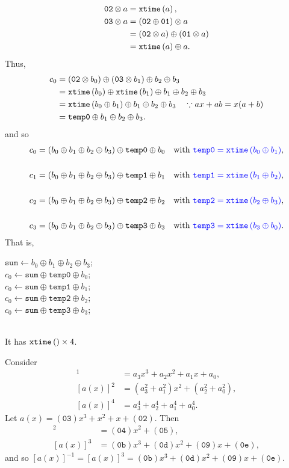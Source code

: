 \begin{align*}
	\texttt{02}\otimes a&=\texttt{xtime}\left(a\right), \\
	\texttt{03}\otimes a&=(\texttt{02}\oplus \texttt{01})\otimes a\\
	&=(\texttt{02}\otimes a)\oplus(\texttt{01}\otimes a) \\
	&=\texttt{xtime}\left(a\right)\oplus a.
\end{align*} Thus, \begin{align*}
c_0&=(\texttt{02}\otimes b_0)\oplus(\texttt{03}\otimes b_1)\oplus b_2\oplus b_3\\
&=\texttt{xtime}\left(b_0\right)\oplus\texttt{xtime}\left(b_1\right)\oplus b_1\oplus b_2\oplus b_3 \\
&=\texttt{xtime}\left(b_0\oplus b_1\right)\oplus b_1\oplus b_2\oplus b_3\quad\because ax+ab=x(a+b) \\
&=\texttt{temp0}\oplus b_1\oplus b_2\oplus b_3.
\end{align*} and so \begin{align*}
c_0&=(b_0\oplus b_1\oplus b_2\oplus b_3)\oplus\texttt{temp0}\oplus b_0 &\text{with}\ \textcolor{blue}{\texttt{temp0} = \texttt{xtime}\left(b_0\oplus b_1\right)},\\ \\
c_1&=(b_0\oplus b_1\oplus b_2\oplus b_3)\oplus\texttt{temp1}\oplus b_1 &\text{with}\ \textcolor{blue}{\texttt{temp1} = \texttt{xtime}\left(b_1\oplus b_2\right)},\\ \\
c_2&=(b_0\oplus b_1\oplus b_2\oplus b_3)\oplus\texttt{temp2}\oplus b_2 &\text{with}\ \textcolor{blue}{\texttt{temp2} = \texttt{xtime}\left(b_2\oplus b_3\right)},\\ \\
c_3&=(b_0\oplus b_1\oplus b_2\oplus b_3)\oplus\texttt{temp3}\oplus b_3 &\text{with}\ \textcolor{blue}{\texttt{temp3} = \texttt{xtime}\left(b_3\oplus b_0\right)}.
\end{align*} That is, \begin{algorithm}
$\texttt{sum}\gets b_0\oplus b_1\oplus b_2\oplus b_3$; \\
$c_0\gets\texttt{sum}\oplus\texttt{temp0}\oplus b_0$; \\
$c_0\gets\texttt{sum}\oplus\texttt{temp1}\oplus b_1$; \\
$c_0\gets\texttt{sum}\oplus\texttt{temp2}\oplus b_2$; \\
$c_0\gets\texttt{sum}\oplus\texttt{temp3}\oplus b_3$; \\
\end{algorithm}\\ It has $\texttt{xtime}\left(\right)\times 4$.

\newpage
Consider \begin{align*}
	[a(x)]^1&=a_3x^3+a_2x^2+a_1x+a_0,\\
	[a(x)]^2&=(a_3^2+a_1^2)x^2+(a_2^2+a_0^2),\\
	[a(x)]^4&=a_3^4+a_2^4+a_1^4+a_0^4.
\end{align*}
Let $a(x)=(\texttt{03})x^3+x^2+x+(\texttt{02})$. Then \begin{align*}
	[a(x)]^2&=(\texttt{04})x^2+(\texttt{05}),\\
	[a(x)]^3&=(\texttt{0b})x^3+(\texttt{0d})x^2+(\texttt{09})x+(\texttt{0e}),
\end{align*} and so $[a(x)]^{-1}=[a(x)]^3=(\texttt{0b})x^3+(\texttt{0d})x^2+(\texttt{09})x+(\texttt{0e})$.
